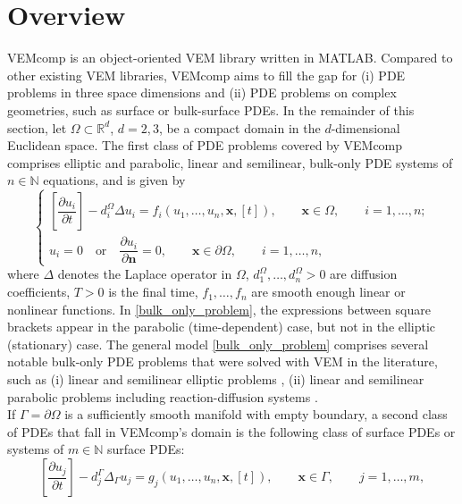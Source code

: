 \documentclass[a4paper]{article}
\newcommand{\boldn}{\boldsymbol{n}}
\newcommand{\boldx}{\boldsymbol{x}}
\begin{document}
\section{Overview}
\label{sec:overview}
VEMcomp is an object-oriented VEM library written in MATLAB.  Compared to other existing VEM libraries, VEMcomp aims to fill the gap for (i) PDE problems in three space dimensions and (ii) PDE problems on complex geometries, such as surface or bulk-surface PDEs. In the remainder of this section, let $\Omega \subset \mathbb{R}^d$, $d=2,3$, be a compact domain in the $d$-dimensional Euclidean space.  The first class of PDE problems covered by VEMcomp comprises elliptic and parabolic, linear and semilinear, bulk-only PDE systems of $n\in\mathbb{N}$ equations, and is given by
\begin{equation}
\label{bulk_only_problem}
\begin{cases}
\left[\dfrac{\partial u_i}{\partial t}\right] - d_i^\Omega\Delta u_i = f_i(u_1,\dots, u_n, \boldx, [t]), \qquad \boldx \in \Omega, \qquad  i=1,\dots,n;\\
u_{i} = 0 \quad \text{or} \quad \dfrac{\partial u_i}{\partial \boldn} = 0,  \qquad \boldx \in \partial \Omega,\qquad  i=1,\dots,n,
\end{cases}
\end{equation}
where $\Delta$ denotes the Laplace operator in $\Omega$, $d_1^\Omega,\dots, d_n^\Omega > 0$ are diffusion coefficients, $T>0$ is the final time, $f_1, \dots, f_n$ are smooth enough linear or nonlinear functions. In \eqref{bulk_only_problem}, the expressions between square brackets appear in the parabolic (time-dependent) case, but not in the elliptic (stationary) case. The general model \eqref{bulk_only_problem} comprises several notable bulk-only PDE problems that were solved with VEM in the literature, such as (i) linear \cite{beirao2013basic, da2017high,da2019virtual} and semilinear elliptic problems \cite{xiao2022nonconforming},  (ii) linear \cite{vacca2015virtual} and semilinear parabolic problems \cite{adak2019convergence} including reaction-diffusion systems \cite{huang2021posteriori}.\\
If $\Gamma = \partial \Omega$ is a sufficiently smooth manifold with empty boundary, a second class of PDEs that fall in VEMcomp's domain is the following class of surface PDEs or systems of $m\in\mathbb{N}$ surface PDEs:
\begin{equation}
\label{surface_problems}
\left[\frac{\partial u_j}{\partial t}\right] - d_j^\Gamma \Delta_\Gamma u_j = g_j(u_1,\dots,u_n, \boldx, [t]), \qquad \boldx \in \Gamma, \qquad j=1,\dots,m,
\end{equation}
\end{document}
